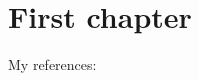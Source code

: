 \documentclass[../main]{subfiles}
\begin{document}
\chapter{First chapter}

My references: \cite{A}



\end{document}
